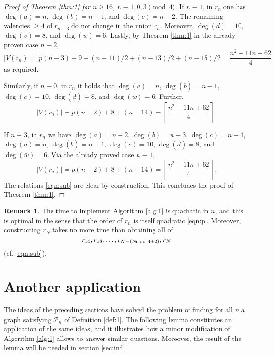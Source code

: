 \documentclass[11pt]{article}
\theoremstyle{definition}
\newtheorem{rem}[thm]{Remark}
\numberwithin{equation}{section}
\def\calP{\mathcal{P}}
\begin{document}
\begin{proof}[Proof of Theorem \ref{thm:1} for $n\geq 16$, $n\equiv 1,0,3 \pmod 4$]
If $n\equiv 1$, in $r_n$ one has $\deg(a)=n$, $\deg(b)=n-1$, and $\deg(c)=n-2$. The remaining valencies $\geq 4$ of $r_{n-3}$ do not change in the union $r_n$. Moreover, $\deg(d)=10$, $\deg(v)=8$, and $\deg(w)=6$. Lastly, by Theorem \ref{thm:1} in the already proven case $n\equiv 2$,
\[|V(r_n)|=p(n-3)+9+(n-11)/2+(n-13)/2+(n-15)/2=\frac{n^2-11n+62}{4}\]
as required.

Similarly, if $n\equiv 0$, in $r_n$ it holds that $\deg(\bar{a})=n$, $\deg(\bar{b})=n-1$, $\deg(\bar{c})=10$, $\deg(\bar{d})=8$, and $\deg(\bar{w})=6$. Further,
\[|V(r_n)|=p(n-2)+8+(n-14)=\left\lceil\frac{n^2-11n+62}{4}\right\rceil.\]

If $n\equiv 3$, in $r_n$ we have $\deg(a)=n-2$, $\deg(b)=n-3$, $\deg(c)=n-4$, $\deg(\bar{a})=n$, $\deg(\bar{b})=n-1$, $\deg(\bar{c})=10$, $\deg(\bar{d})=8$, and $\deg(\bar{w})=6$. Via the already proved case $n\equiv 1$,
\[|V(r_n)|=p(n-2)+8+(n-14)=\left\lceil\frac{n^2-11n+62}{4}\right\rceil.\]
The relations \eqref{eqn:sub} are clear by construction. This concludes the proof of Theorem \ref{thm:1}.
\end{proof}


\begin{rem}
The time to implement Algorithm \ref{alg:1} is quadratic in $n$, and this is optimal in the sense that the order of $r_n$ is itself quadratic \eqref{eqn:p}. Moreover, constructing $r_N$ takes no more time than obtaining all of
\[r_{14},r_{18},\dots,r_{N-(N\hspace{-0.25cm}\mod 4+2)},r_N\]
(cf. \eqref{eqn:sub}).
\end{rem}



\section{Another application}
\label{sec:ap}
The ideas of the preceding sections have solved the problem of finding for all $n$ a graph satisfying $\calP_n$ of Definition \ref{def:1}. The following lemma constitutes an application of the same ideas, and it illustrates how a minor modification of Algorithm \ref{alg:1} allows to answer similar questions. Moreover, the result of the lemma will be needed in section \ref{sec:ind}.
\end{document}
